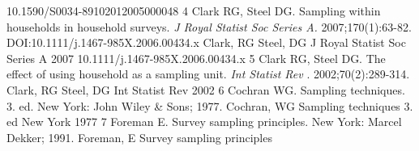 \documentclass{article}
\begin{document}
10.1590/S0034-89102012005000048%
4%
Clark RG, Steel DG. Sampling within households in household surveys. %
\textit{J Royal Statist Soc Series A.}
 2007;170(1):63-82. DOI:10.1111/j.1467-985X.2006.00434.x%
Clark, %
RG
Steel, %
DG
J Royal Statist Soc Series A%
2007%
10.1111/j.1467-985X.2006.00434.x%
5%
Clark RG, Steel DG. The effect of using household as a sampling unit. %
\textit{Int Statist Rev}
. 2002;70(2):289-314.%
Clark, %
RG
Steel, %
DG
Int Statist Rev%
2002%
6%
Cochran WG. Sampling techniques. 3. ed. New York: John Wiley \& Sons; 1977.%
Cochran, %
WG
Sampling techniques%
3. ed%
New York%
1977%
7%
Foreman E. Survey sampling principles. New York: Marcel Dekker; 1991.%
Foreman, %
E
Survey sampling principles%
\end{document}
